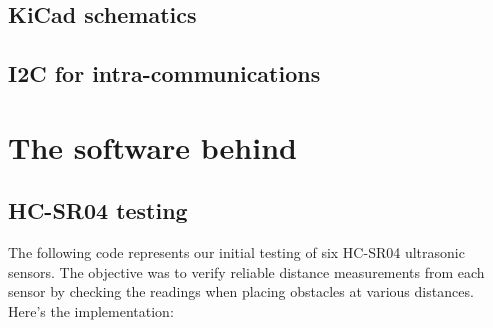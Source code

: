 \documentclass{article}
\begin{document}
\subsection{KiCad schematics}
\begin{figure}[H]
    \centering
\end{figure}


\subsection{I2C for intra-communications} %

\newpage
\section{The software behind} %
\newpage
\subsection{HC-SR04 testing}
The following code represents our initial testing of six HC-SR04 ultrasonic sensors. The objective was to verify reliable distance measurements from each sensor by checking the readings when placing obstacles at various distances. Here's the implementation:
\end{document}
